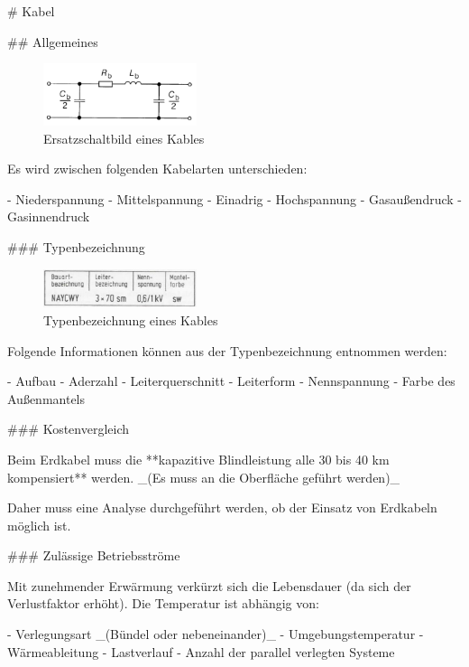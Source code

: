 \begin{markdown}
# Kabel

## Allgemeines

\begin{figure}
    \vspace{-1em}
    \centering
    \includegraphics[width=0.4\textwidth]{./images/09-Kabel/Ersatzschaltbild.png}
    \caption[Ersatzschaltbild eines Kables]{Ersatzschaltbild eines Kables}
\end{figure}

Es wird zwischen folgenden Kabelarten unterschieden:

- Niederspannung
- Mittelspannung
- Einadrig
- Hochspannung
    - Gasaußendruck
    - Gasinnendruck

### Typenbezeichnung

\begin{figure}
    \centering
    \includegraphics[width=0.4\textwidth]{./images/09-Kabel/Typenbezeichnung.png}
    \caption[Typenbezeichnung eines Kables]{Typenbezeichnung eines Kables}
\end{figure}

Folgende Informationen können aus der Typenbezeichnung entnommen werden:

- Aufbau
- Aderzahl
- Leiterquerschnitt
- Leiterform
- Nennspannung
- Farbe des Außenmantels

### Kostenvergleich


Beim Erdkabel muss die **kapazitive Blindleistung alle 30 bis 40 km kompensiert** werden. _(Es muss an die Oberfläche geführt werden)_

Daher muss eine Analyse durchgeführt werden, ob der Einsatz von Erdkabeln möglich ist.

### Zulässige Betriebsströme


Mit zunehmender Erwärmung verkürzt sich die Lebensdauer (da sich der Verlustfaktor erhöht).
Die Temperatur ist abhängig von:

- Verlegungsart _(Bündel oder nebeneinander)_
- Umgebungstemperatur
- Wärmeableitung
- Lastverlauf
- Anzahl der parallel verlegten Systeme

\end{markdown}

